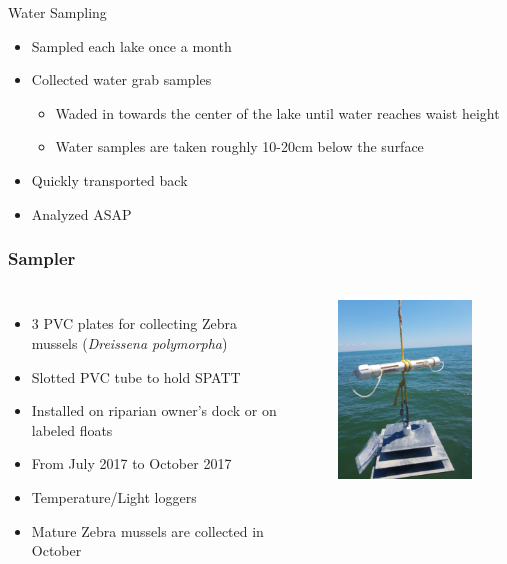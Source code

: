 \begin{frame}{Water Sampling}

	\begin{itemize}
		\item Sampled each lake once a month
		\item Collected water grab samples
			\begin{itemize}
				\item Waded in towards the center of the lake until water reaches waist height
				\item Water samples are taken roughly 10-20cm below the surface
			\end{itemize}
		\item Quickly transported back
		\item Analyzed ASAP
	\end{itemize}

\end{frame}
\begin{frame}
	\frametitle{Sampler}
\begin{columns}
	\begin{itemize}
		\item 3 PVC plates for collecting Zebra mussels (\emph{Dreissena polymorpha})
		\item Slotted PVC tube to hold SPATT 
		\item Installed on riparian owner's dock or on labeled floats  
		\item From July 2017 to October 2017
		\item Temperature/Light loggers 
		\item Mature Zebra mussels are collected in October
	\end{itemize}
	\begin{figure}
		\includegraphics[width=2.3in,angle=-90]{sampler.jpg}
	\end{figure}
\end{columns}


\end{frame}



